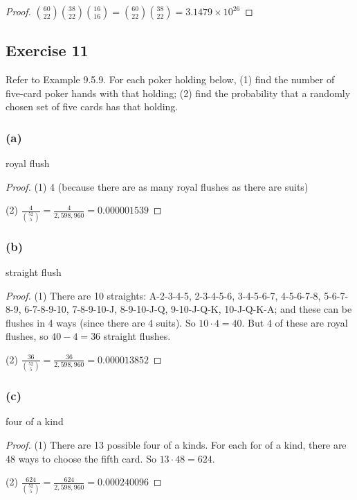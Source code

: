 \documentclass[14pt]{extarticle}
\newcommand{\dps}{\displaystyle}
\begin{document}
\begin{proof}
\(\binom{60}{22}\binom{38}{22}\binom{16}{16} = \binom{60}{22}\binom{38}{22} = 3.1479 \times 10^{26}\)
\end{proof}

\subsection{Exercise 11}
Refer to Example 9.5.9. For each poker holding below, (1) find the number of five-card poker hands with that holding; 
(2) find the probability that a randomly chosen set of five cards has that holding.

\subsubsection{(a)}
royal flush

\begin{proof}
(1) 4 (because there are as many royal flushes as there are suits)

(2) \(\dps \frac{4}{\binom{52}{5}} = \frac{4}{2,598,960} = 0.000001539\)
\end{proof}

\subsubsection{(b)}
straight flush

\begin{proof}
(1) There are 10 straights: A-2-3-4-5, 2-3-4-5-6, 3-4-5-6-7, 4-5-6-7-8, 5-6-7-8-9, 6-7-8-9-10, 7-8-9-10-J, 8-9-10-J-Q, 
9-10-J-Q-K, 10-J-Q-K-A; and these can be flushes in 4 ways (since there are 4 suits). So \(10 \cdot 4 = 40\). But 4 of
these are royal flushes, so \(40 - 4 = 36\) straight flushes.

(2) \(\dps \frac{36}{\binom{52}{5}} = \frac{36}{2,598,960} = 0.000013852\)
\end{proof}

\subsubsection{(c)}
four of a kind

\begin{proof}
(1) There are 13 possible four of a kinds. For each for of a kind, there are 48 ways to choose the fifth card. 
So \(13 \cdot 48 = 624\).

(2) \(\dps \frac{624}{\binom{52}{5}} = \frac{624}{2,598,960} = 0.000240096\)
\end{proof}
\end{document}
